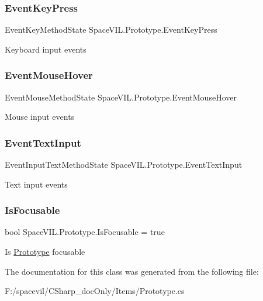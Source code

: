 \subsubsection{\texorpdfstring{Event\+Key\+Press}{EventKeyPress}}
{\footnotesize\ttfamily Event\+Key\+Method\+State Space\+V\+I\+L.\+Prototype.\+Event\+Key\+Press}



Keyboard input events 

\mbox{\label{class_space_v_i_l_1_1_prototype_aede77dddfe637d7c5395ad1cce5a7604}} 
\subsubsection{\texorpdfstring{Event\+Mouse\+Hover}{EventMouseHover}}
{\footnotesize\ttfamily Event\+Mouse\+Method\+State Space\+V\+I\+L.\+Prototype.\+Event\+Mouse\+Hover}



Mouse input events 

\mbox{\label{class_space_v_i_l_1_1_prototype_a582dbed570a2eea18c616d0994549a08}} 
\subsubsection{\texorpdfstring{Event\+Text\+Input}{EventTextInput}}
{\footnotesize\ttfamily Event\+Input\+Text\+Method\+State Space\+V\+I\+L.\+Prototype.\+Event\+Text\+Input}



Text input events 

\mbox{\label{class_space_v_i_l_1_1_prototype_acae2b941788e7a8e8c3a80fd1a4aa376}} 
\subsubsection{\texorpdfstring{Is\+Focusable}{IsFocusable}}
{\footnotesize\ttfamily bool Space\+V\+I\+L.\+Prototype.\+Is\+Focusable = true}



Is \mbox{\hyperlink{class_space_v_i_l_1_1_prototype}{Prototype}} focusable 



The documentation for this class was generated from the following file\+:\begin{DoxyCompactItemize}
\item 
F\+:/spacevil/\+C\+Sharp\+\_\+doc\+Only/\+Items/Prototype.\+cs\end{DoxyCompactItemize}
